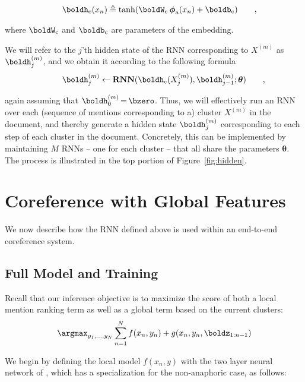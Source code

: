 \documentclass[11pt,letterpaper]{article}
\newcommand{\RNN}{\mathrm{\mathbf{RNN}}}
\renewcommand{\btheta}{\boldsymbol{\theta}}
\newcommand{\aphi}{\boldsymbol{\phi}_{\mathrm{a}}}
\newcommand{\niceq}{\ensuremath{\,{=}\,}}
\newcommand{\uc}{\ensuremath{\mathrm{c}}}
\newcommand{\hc}{\boldh_{\uc}}
\newcommand{\cb}{\boldb_{\mathrm{\uc}}}
\newcommand{\cW}{\boldW_{\mathrm{\uc}}}
\newcommand{\eqpunc}[1]{{\makebox[0pt][l]{\qquad\rm{#1}}}}
\begin{document}
\vspace{-3mm}

{\small
\begin{align*}
\hc(x_n) &\triangleq \tanh(\cW \, \aphi(x_n) + \cb)\eqpunc{,}
\end{align*}
}

\vspace{-5mm}
\noindent where $\cW$ and $\cb$ are parameters of the embedding.

We will refer to the $j$'th hidden state of the RNN corresponding to $X^{(m)}$ as $\boldh^{(m)}_j$, and we obtain it according to the following formula
{\small
\begin{align*}
\boldh^{(m)}_j \gets \RNN(\hc(X_j^{(m)}), \boldh^{(m)}_{j-1}; \btheta)\eqpunc{,}
\end{align*}
} 

\vspace{-4mm}
\noindent again assuming that $\boldh^{(m)}_0 \niceq \bzero$. Thus, we will effectively run an RNN over each (sequence of mentions corresponding to a) cluster $X^{(m)}$ in the document, and thereby generate a hidden state $\boldh^{(m)}_j$ corresponding to each step of each cluster in the document.  Concretely, this can be implemented by maintaining $M$ RNNs -- one for each cluster -- that all share the parameters $\btheta$. The process is illustrated in the top portion of Figure~\ref{fig:hidden}.
 
\section{Coreference with Global Features}
\label{sec:fullmod}
We now describe how the RNN defined above is used within an end-to-end coreference system. 
\subsection{Full Model and Training}
\label{sec:model}
Recall that our inference objective is to maximize the score of both a local mention ranking term as well as a global term based on the current clusters: 
\vspace{-1mm}
{\small
\begin{align*}
 \argmax_{y_1,
  \ldots, y_N} \sum_{n=1}^N f(x_n, y_n) + g(x_n, y_n, \boldz_{1:n-1})
\end{align*}
}

\vspace{-3mm}
\noindent We begin by defining the local model $f(x_n,y)$ with the two layer neural network of , which has a specialization for the non-anaphoric case, as follows:    
\end{document}
